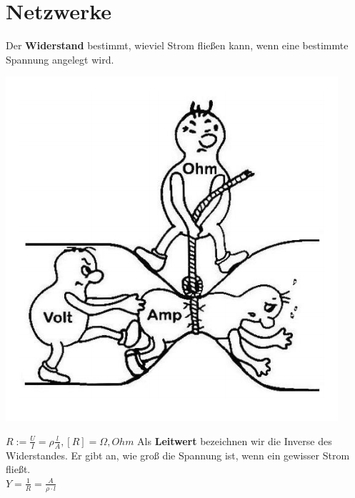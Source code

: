 %
%
%
%
%

					\section{Netzwerke}
					\label{chap:Style}



					\beginip
					Der \textbf{Widerstand} bestimmt, wieviel Strom fließen kann, wenn eine bestimmte Spannung angelegt wird. \\
					\begin{center}
						\includegraphics[scale=0.25]{img/widerstand.png}
					\end{center}
					\formulaBegin
					$ R :=  \frac{U}{I} =  \rho  \frac{l}{A},   {[R]} = \Omega, Ohm $
					\formulaEnd
					Als \textbf{Leitwert} bezeichnen wir die Inverse des Widerstandes. Er gibt an, wie groß die Spannung ist, wenn ein gewisser Strom fließt. \\
					\formulaBegin
					$ Y = \frac{1}{R} = \frac{A}{\rho \cdot l} $
					\formulaEnd
					\iend




